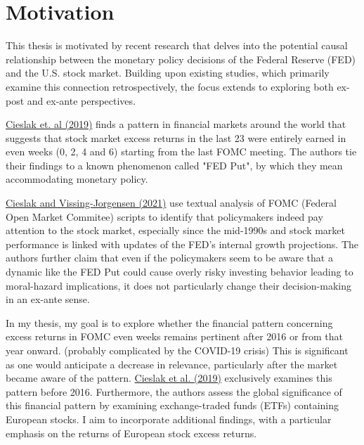 
\chapter{Motivation}

This thesis is motivated by recent research that delves into the potential causal relationship between the monetary policy decisions of the Federal Reserve (FED) and the U.S. stock market.  Building upon existing studies, which primarily examine this connection retrospectively,  the focus extends to exploring both ex-post and ex-ante perspectives.

\hyperref[item:cieslak_stock_2019]{Cieslak et. al (2019)} finds a pattern in financial markets around the world that suggests that stock market excess returns in the last 23 were entirely earned in even weeks (0, 2, 4 and 6) starting from the last FOMC meeting. The authors tie their findings to a known phenomenon called "FED Put", by which they mean accommodating monetary policy.

\hyperref[item:cieslak_economics_2021]{Cieslak and Vissing-Jorgensen (2021)} use textual analysis of FOMC (Federal Open Market Commitee) scripts to identify that policymakers indeed pay attention to the stock market, especially since the mid-1990s and stock market performance is linked with updates of the FED’s internal growth projections.  The authors further claim that even if the policymakers seem to be aware that a dynamic like the FED Put could cause overly risky investing behavior leading to moral-hazard implications,  it does not particularly change their decision-making in an ex-ante sense.

In my thesis, my goal is to explore whether the financial pattern concerning excess returns in FOMC even weeks remains pertinent after 2016 or from that year onward.  (probably complicated by the COVID-19 crisis) This is significant as one would anticipate a decrease in relevance, particularly after the market became aware of the pattern.  \hyperref[item:cieslak_stock_2019]{Cieslak et al. (2019)} exclusively examines this pattern before 2016. Furthermore, the authors assess the global significance of this financial pattern by examining exchange-traded funds (ETFs) containing European stocks. I aim to incorporate additional findings, with a particular emphasis on the returns of European stock excess returns.


